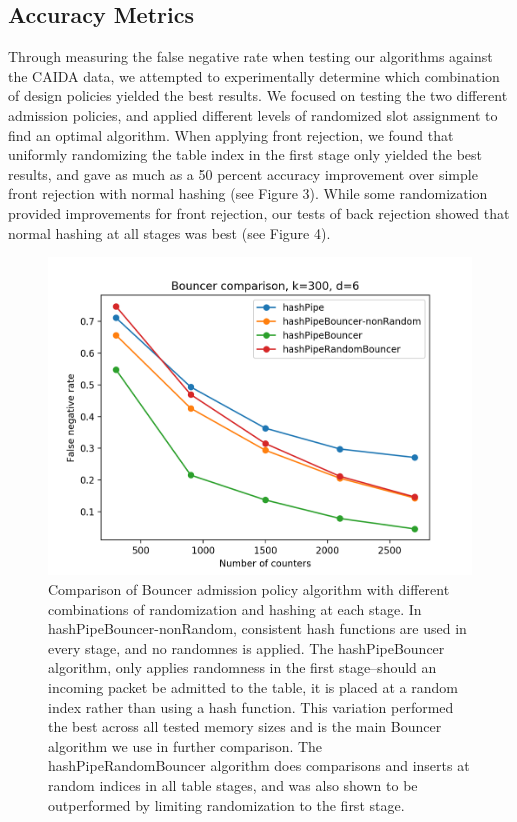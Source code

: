 \subsection{Accuracy Metrics}
Through measuring the false negative rate when testing our algorithms against the CAIDA data, we attempted to experimentally determine which combination of design policies yielded the best results. We focused on testing the two different admission policies, and applied different levels of randomized slot assignment to find an optimal algorithm. When applying front rejection, we found that uniformly randomizing the table index in the first stage only yielded the best results, and gave as much as a 50 percent accuracy improvement over simple front rejection with normal hashing (see Figure 3). While some randomization provided improvements for front rejection, our tests of back rejection showed that normal hashing at all stages was best (see Figure 4).
\begin{figure}[t]
  \centering
    \includegraphics[scale=0.5]{bouncer}
     \caption{Comparison of Bouncer admission policy algorithm with different combinations of randomization and hashing at each stage. In hashPipeBouncer-nonRandom, consistent hash functions are used in every stage, and no randomnes is applied. The hashPipeBouncer algorithm, only applies randomness in the first stage--should an incoming packet be admitted to the table, it is placed at a random index rather than using a hash function. This variation performed the best across all tested memory sizes and is the main Bouncer algorithm we use in further comparison. The hashPipeRandomBouncer algorithm does comparisons and inserts at random indices in all table stages, and was also shown to be outperformed by limiting randomization to the first stage.}
     \label{fig:bp-image}
\end{figure}
